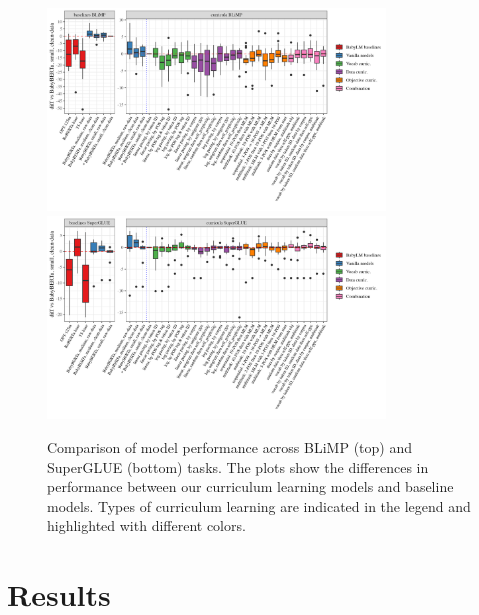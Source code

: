 \begin{figure}[htbp]
    \centering
    \includegraphics[width=0.8\textwidth]{chapters/climb/figures/babylm_blimp_diffs_boxplots.png}
    \vspace{1em}  %
    \includegraphics[width=0.8\textwidth]{chapters/climb/figures/babylm_superglue_diffs_boxplots.png}
    \caption{Comparison of model performance across BLiMP (top) and SuperGLUE (bottom) tasks. The plots show the differences in performance between our curriculum learning models and baseline models. Types of curriculum learning are indicated in the legend and highlighted with different colors.}
    \label{fig:combined-boxplots}
\end{figure}


\section{Results}

